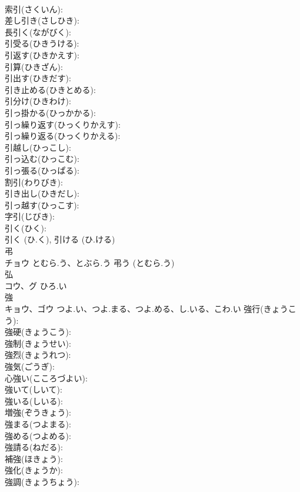 \documentclass[8pt]{extreport}
\begin{document}
\begin{CJK}{UTF8}{min}
\\	索引(さくいん): 
\\	差し引き(さしひき): 
\\	長引く(ながびく): 
\\	引受る(ひきうける): 
\\	引返す(ひきかえす): 
\\	引算(ひきざん): 
\\	引出す(ひきだす): 
\\	引き止める(ひきとめる): 
\\	引分け(ひきわけ): 
\\	引っ掛かる(ひっかかる): 
\\	引っ繰り返す(ひっくりかえす): 
\\	引っ繰り返る(ひっくりかえる): 
\\	引越し(ひっこし): 
\\	引っ込む(ひっこむ): 
\\	引っ張る(ひっぱる): 
\\	割引(わりびき): 
\\	引き出し(ひきだし): 
\\	引っ越す(ひっこす): 
\\	字引(じびき): 
\\	引く(ひく): 
\\	引く (ひ.く), 引ける (ひ.ける)
\\	弔			
\\	チョウ	とむら.う、とぶら.う		弔う (とむら.う)
\\	弘			
\\	コウ、グ	ひろ.い		
\\	強			
\\	キョウ、ゴウ	つよ.い、つよ.まる、つよ.める、し.いる、こわ.い	強行(きょうこう): 
\\	強硬(きょうこう): 
\\	強制(きょうせい): 
\\	強烈(きょうれつ): 
\\	強気(ごうぎ): 
\\	心強い(こころづよい): 
\\	強いて(しいて): 
\\	強いる(しいる): 
\\	増強(ぞうきょう): 
\\	強まる(つよまる): 
\\	強める(つよめる): 
\\	強請る(ねだる): 
\\	補強(ほきょう): 
\\	強化(きょうか): 
\\	強調(きょうちょう): 

\end{CJK}
\end{document}
